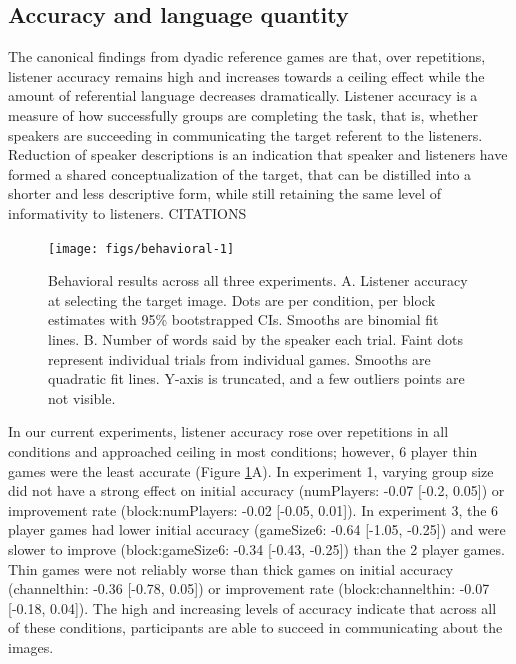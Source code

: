 \documentclass[
  english,
  a4paper,
]{article}
\begin{document}
\hypertarget{accuracy-and-language-quantity}{%
\subsection{Accuracy and language quantity}\label{accuracy-and-language-quantity}}

The canonical findings from dyadic reference games are that, over repetitions, listener accuracy remains high and increases towards a ceiling effect while the amount of referential language decreases dramatically. Listener accuracy is a measure of how successfully groups are completing the task, that is, whether speakers are succeeding in communicating the target referent to the listeners. Reduction of speaker descriptions is an indication that speaker and listeners have formed a shared conceptualization of the target, that can be distilled into a shorter and less descriptive form, while still retaining the same level of informativity to listeners. CITATIONS

\begin{figure}[t!]

{\centering \texttt{[image: figs/behavioral-1]} 

}

\caption{Behavioral results across all three experiments. A. Listener accuracy at selecting the target image. Dots are per condition, per block estimates with 95\% bootstrapped CIs. Smooths are binomial fit lines. B. Number of words said by the speaker each trial. Faint dots represent individual trials from individual games. Smooths are quadratic fit lines. Y-axis is truncated, and a few outliers points are not visible. }\label{fig:behavioral}
\end{figure}

In our current experiments, listener accuracy rose over repetitions in all conditions and approached ceiling in most conditions; however, 6 player thin games were the least accurate (Figure \ref{fig:behavioral}A). In experiment 1, varying group size did not have a strong effect on initial accuracy (numPlayers: -0.07 {[}-0.2, 0.05{]}) or improvement rate (block:numPlayers: -0.02 {[}-0.05, 0.01{]}). In experiment 3, the 6 player games had lower initial accuracy (gameSize6: -0.64 {[}-1.05, -0.25{]}) and were slower to improve (block:gameSize6: -0.34 {[}-0.43, -0.25{]}) than the 2 player games. Thin games were not reliably worse than thick games on initial accuracy (channelthin: -0.36 {[}-0.78, 0.05{]}) or improvement rate (block:channelthin: -0.07 {[}-0.18, 0.04{]}). The high and increasing levels of accuracy indicate that across all of these conditions, participants are able to succeed in communicating about the images.
\end{document}
